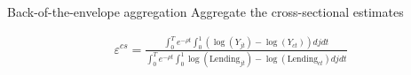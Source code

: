 \documentclass[english,xcolor=svgnames]{beamer}
\begin{document}
%
%
%
%
%
%
%
%
%
%

\begin{frame}{Back-of-the-envelope aggregation}
Aggregate the cross-sectional estimates

\begin{align}
\varepsilon^{cs} = \frac{\int_0^T e^{-\rho t} \int_0^1 \left(\log(Y_{jt}) - \log(Y_{ct})\right) dj dt} {\int_0^T e^{-\rho t}   \int_0^1 \log(\text{Lending}_{jt})  - \log(\text{Lending}_{ct}) dj dt}
\end{align}
\end{frame}
\end{document}
